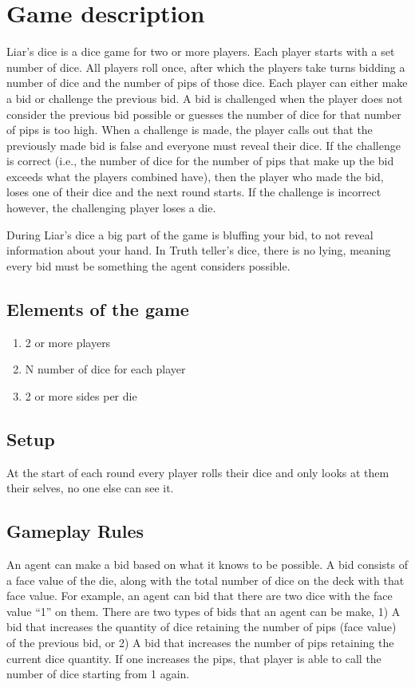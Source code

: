 \documentclass{article}
\begin{document}
\section*{Game description}
Liar's dice is a dice game for two or more players. Each player starts with a set number of dice. All players roll once, after which the players take turns bidding a number of dice and the number of pips of those dice. Each player can either make a bid or challenge the previous bid. A bid is challenged when the player does not consider the previous bid possible or guesses the number of dice for that number of pips is too high. When a challenge is made, the player calls out that the previously made bid is false and everyone must reveal their dice. If the challenge is correct (i.e., the number of dice for the number of pips that make up the bid exceeds what the players combined have), then the player who made the bid, loses one of their dice and the next round starts. If the challenge is incorrect however, the challenging player loses a die.

During Liar's dice a big part of the game is bluffing your bid, to not reveal information about your hand. In Truth teller's dice, there is no lying, meaning every bid must be something the agent considers possible.

\subsection*{Elements of the game} %
\begin{enumerate}
    \item 2 or more players
    \item N number of dice for each player
    \item 2 or more sides per die
\end{enumerate}
\subsection*{Setup} %
At the start of each round every player rolls their dice and only looks at them their selves, no one else can see it.

\subsection*{Gameplay Rules} %
An agent can make a bid based on what it knows to be possible. A bid consists of a face value of the die, along with the total number of dice on the deck with that face value. For example, an agent can bid that there are two dice with the face value “1” on them. There are two types of bids that an agent can be make, 1) A bid that increases the quantity of dice retaining the number of pips (face value) of the previous bid, or 2) A bid that increases the number of pips retaining the current dice quantity. If one increases the pips, that player is able to call the number of dice starting from 1 again.
\end{document}
